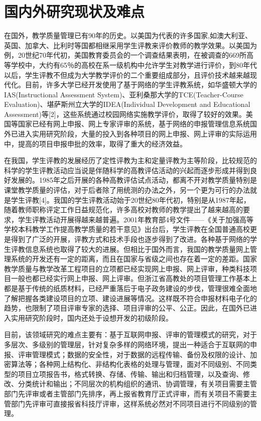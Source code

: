 
\chapter{国内外研究现状及难点}
在国外，教学质量管理已有90年的历史。以美国为代表的许多国家,如澳大利亚、英国、加拿大、比利时等国都相继采用学生评教来评价教师的教学效果。以美国为例，20世纪70年代初，美国教育委员会的一个调查结果表明，在被调查的669所高等学校中，大约有65％的高校在系一级机构中允许学生对教学进行评价，到80年代以后，学生评教不但成为大学教学评价的二个重要组成部分，且评价技术越来越现代化。目前，许多大学已经开发使用了基于网络的学生评教系统，如华盛顿大学的IAS(Instructional Assessment System)、亚利桑那大学的TCE(Teacher-Course Evaluation)、堪萨斯州立大学的IDEA(Individual Development and Educational Assessment)等[2]，这些系统通过校园网络实施教学评价，取得了较好的效果。美国等国家已经有网上申报、网上专家评审的系统，基于网络的申报管理信息系统国外已进入实用研究阶段，大量的投入到各种项目的网上申报、网上评审的实际运用中，提高的项目申报申批的效率，取得了重大的经济效益。

在我国，学生评教的发展经历了定性评教为主和定量评教为主等阶段，比较规范的科学的学生评教活动应当说是伴随科学的高教评估活动的兴起而逐步形成并得到良好发展的。1985年之后开展的各种高教评估试点活动，都离不开对教学质量特别是课堂教学质量的评估，对于后者除了用统测的办法之外，另一个更为可行的办法就是学生评教[4]。我国的学生评教活动始于20世纪80年代初，特别是从1987年起，随着教师职称评定工作日益规范化，许多高校对教师的教学提出了越来越高的要求，学生评教活动开展得越来越普遍。2001年教育部4号文件——《关于加强高等学校本科教学工作提高教学质量的若干意见》出台后，学生评教在全国普通高校更是得到了广泛的开展，评教方式和技术手段也逐步得到了改进。各种基于网络的学生评教信息系统也取得了较大的进展。但相比于国外而言，我国的教学质量网上管理系统的开发还有一定的距离，而且在国家与省级之间也存在着一定的差距。国家教学质量与教学改革工程项目的立项都已经实现网上申报、网上评审，种类科技项目一般也都已经实行网上申报、网上评审。但浙江省高教处的项目管理工作基本上都是基于传统的纸质材料，已经严重落后于电子政务建设的步伐，管理很难全面地了解把握各类建设项目的立项、建设进展等情况。这样既不符合申报材料电子化的趋势，也限制了项目评审专家的选择、项目评审的公平、公正。因此，在国外已进入实用研究阶段时，国内还处于设想开发的初级阶段。

目前，该领域研究的难点主要有：基于互联网申报、评审的管理模式的研究，对于多层次、多级别的管理层，针对复杂多样的网络环境，提出一种适合于互联网的申报、评审管理模式；数据的安全性，对于数据的远程传输、备份及权限的设计、加密算法等；各种网上结构化、非结构化表格的处理与管理，面对不同级别、不同类型的项目立项报告书，格式转换、存储、传输、输出和归档管理，以及查询、修改、分类统计和输出；不同层次的机构组织的通讯、协调管理，有关项目需要主管部门先评审或者主管部门先排序，再上报省教育厅正式评审，而有关项目不需要主管部门先评审可直接报省科技厅评审，这样系统必然对不同项目进行不同级别的管理。
